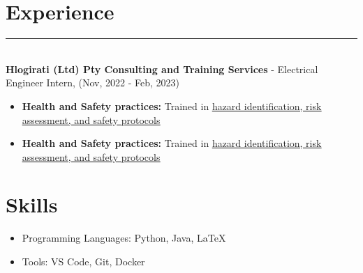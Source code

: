 \documentclass[12pt]{article}
\begin{document}
\vspace{-3mm}\section*{\fontsize{14}{1}\selectfont\color{color_29791}Experience}\vspace{-9pt} 
\rule{\textwidth}{0.4pt}
\vspace{2pt}
\\\textbf{Hlogirati (Ltd) Pty Consulting and Training Services} - Electrical Engineer Intern, (Nov, 2022 - Feb, 2023)
\vspace{-3mm}\begin{itemize}
  \item \textbf{Health and Safety practices:} Trained in \href{https://drive.google.com/file/d/1i5SDy8WoBzwGOmAEAcxJzVyCb1c7Gfqq/view?usp=sharing}{\underline{hazard identification, risk assessment, and safety protocols}}
  \vspace{-3mm}\item \textbf{Health and Safety practices:} Trained in \href{https://drive.google.com/file/d/1i5SDy8WoBzwGOmAEAcxJzVyCb1c7Gfqq/view?usp=sharing}{\underline{hazard identification, risk assessment, and safety protocols}}
\end{itemize}

\section*{Skills}
\begin{itemize}
  \item Programming Languages: Python, Java, LaTeX
  \item Tools: VS Code, Git, Docker
\end{itemize}
\end{document}
